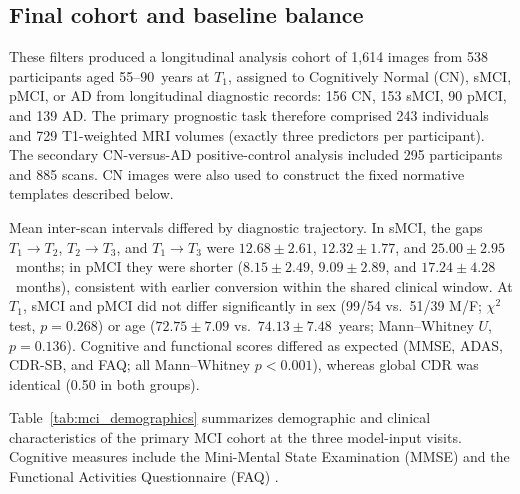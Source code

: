 \documentclass[review]{elsarticle}
\begin{document}
	\subsection{Final cohort and baseline balance}
	These filters produced a longitudinal analysis cohort of 1,614 images from 538 participants aged 55--90~years at $T_1$, assigned to Cognitively Normal (CN), sMCI, pMCI, or AD from longitudinal diagnostic records: 156 CN, 153 sMCI, 90 pMCI, and 139 AD. The primary prognostic task therefore comprised 243 individuals and 729 T1-weighted MRI volumes (exactly three predictors per participant). The secondary CN-versus-AD positive-control analysis included 295 participants and 885 scans. CN images were also used to construct the fixed normative templates described below.
	
	Mean inter-scan intervals differed by diagnostic trajectory. In sMCI, the gaps $T_1{\to}T_2$, $T_2{\to}T_3$, and $T_1{\to}T_3$ were $12.68\pm2.61$, $12.32\pm1.77$, and $25.00\pm2.95$~months; in pMCI they were shorter ($8.15\pm2.49$, $9.09\pm2.89$, and $17.24\pm4.28$~months), consistent with earlier conversion within the shared clinical window. At $T_1$, sMCI and pMCI did not differ significantly in sex (99/54 vs.\ 51/39 M/F; $\chi^2$ test, $p=0.268$) or age ($72.75\pm7.09$ vs.\ $74.13\pm7.48$~years; Mann--Whitney $U$, $p=0.136$). Cognitive and functional scores differed as expected (MMSE, ADAS, CDR-SB, and FAQ; all Mann--Whitney $p<0.001$), whereas global CDR was identical (0.50 in both groups).
	
	Table~\ref{tab:mci_demographics} summarizes demographic and clinical characteristics of the primary MCI cohort at the three model-input visits. Cognitive measures include the Mini-Mental State Examination (MMSE) \citep{folstein-1975} and the Functional Activities Questionnaire (FAQ) \citep{pfeffer-1982}.
	
\end{document}
